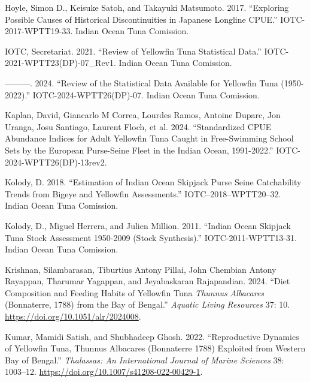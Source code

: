\documentclass[
]{scrartcl}
\newlength{\cslhangindent}
\newenvironment{CSLReferences}[2] %
 {\begin{list}{}{%
  \setlength{\itemindent}{0pt}
  \setlength{\leftmargin}{0pt}
  \setlength{\parsep}{0pt}
  \ifodd #1
   \setlength{\leftmargin}{\cslhangindent}
   \setlength{\itemindent}{-1\cslhangindent}
  \fi
  \setlength{\itemsep}{#2\baselineskip}}}
 {\end{list}}
\begin{document}
\begin{CSLReferences}{1}{0}
Hoyle, Simon D., Keisuke Satoh, and Takayuki Matsumoto. 2017.
{``Exploring Possible Causes of Historical Discontinuities in {Japanese}
Longline {CPUE}.''} IOTC-2017-WPTT19-33. Indian Ocean Tuna Comission.

IOTC, Secretariat. 2021. {``Review of {Yellowfin Tuna Statistical
Data}.''} IOTC-2021-WPTT23(DP)-07\_Rev1. Indian Ocean Tuna Comission.

---------. 2024. {``Review of the Statistical Data Available for
Yellowfin Tuna (1950-2022).''} IOTC-2024-WPTT26(DP)-07. Indian Ocean
Tuna Comission.

Kaplan, David, Giancarlo M Correa, Lourdes Ramos, Antoine Duparc, Jon
Uranga, Josu Santiago, Laurent Floch, et al. 2024. {``Standardized
{CPUE} Abundance Indices for Adult Yellowfin Tuna Caught in
Free-Swimming School Sets by the {European} Purse-Seine Fleet in the
{Indian Ocean}, 1991-2022.''} IOTC-2024-WPTT26(DP)-13rev2.

Kolody, D. 2018. {``Estimation of {Indian Ocean Skipjack Purse Seine
Catchability Trends} from {Bigeye} and {Yellowfin Assessments}.''}
IOTC--2018--WPTT20--32. Indian Ocean Tuna Comission.

Kolody, D., Miguel Herrera, and Julien Million. 2011. {``Indian {Ocean
Skipjack Tuna Stock Assessment} 1950-2009 ({Stock Synthesis}).''}
IOTC-2011-WPTT13-31. Indian Ocean Tuna Comission.

Krishnan, Silambarasan, Tiburtius Antony Pillai, John Chembian Antony
Rayappan, Tharumar Yagappan, and Jeyabaskaran Rajapandian. 2024. {``Diet
Composition and Feeding Habits of Yellowfin Tuna {\emph{Thunnus}}{
\emph{Albacares}} ({Bonnaterre}, 1788) from the {Bay} of {Bengal}.''}
\emph{Aquatic Living Resources} 37: 10.
\url{https://doi.org/10.1051/alr/2024008}.

Kumar, Mamidi Satish, and Shubhadeep Ghosh. 2022. {``Reproductive
{Dynamics} of {Yellowfin Tuna}, {Thunnus} Albacares ({Bonnaterre} 1788)
{Exploited} from {Western Bay} of {Bengal}.''} \emph{Thalassas: An
International Journal of Marine Sciences} 38: 1003--12.
\url{https://doi.org/10.1007/s41208-022-00429-1}.


\end{CSLReferences}
\end{document}
